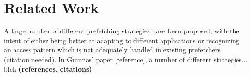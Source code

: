 
\section{Related Work}
\label{sec:relatedWork}

A large number of different prefetching strategies have been proposed,
with the intent of either being better at adapting to different
applications or recognizing an access pattern which is not adequately
handled in existing prefetchers (citation needed). In Grannas' paper
[reference], a number of different strategies... bleh
{\bf (references, citations)}